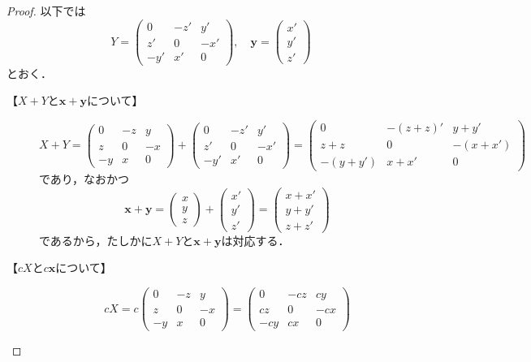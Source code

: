\documentclass[a4paper,10pt,fleqn]{ltjsarticle}
\begin{document}
\begin{leftbar}
    \begin{proof}
        以下では
        \[
            Y = \begin{pmatrix} 0 & -z ' & y ' \\ z' & 0 & -x' \\ -y' & x ' & 0 \end{pmatrix},\quad \bm{y} = \begin{pmatrix} x' \\ y ' \\ z ' \end{pmatrix}
        \]
        とおく．
        \begin{description}
            \item[【$X+Y$と$\bm{x}+\bm{y}$について】]
                  \[
                      X + Y  = \begin{pmatrix} 0 & -z & y \\ z & 0 & -x \\ -y & x & 0 \end{pmatrix}+ \begin{pmatrix} 0 & -z ' & y ' \\ z' & 0 & -x' \\ -y' & x ' & 0 \end{pmatrix} = \begin{pmatrix} 0 & -(z+z)' & y+y' \\ z+z & 0 & -(x+x') \\ -(y+y') & x+x' & 0 \end{pmatrix}
                  \]
                  であり，なおかつ
                  \[
                      \bm{x}+\bm{y} =\begin{pmatrix} x \\ y \\ z \end{pmatrix}+ \begin{pmatrix} x' \\ y' \\ z' \end{pmatrix} = \begin{pmatrix} x+x' \\ y+y' \\ z+z' \end{pmatrix}
                  \]
                  であるから，たしかに$X+Y$と$\bm{x}+\bm{y}$は対応する．
            \item[【$cX$と$c\bm{x}$について】]
                  \[
                      cX =c\begin{pmatrix} 0 & -z & y \\ z & 0 & -x \\ -y & x & 0 \end{pmatrix} =\begin{pmatrix} 0 & -cz & cy \\ cz & 0 & -cx \\ -cy & cx & 0 \end{pmatrix}
\]
\end{description}
\end{proof}
\end{leftbar}
\end{document}

